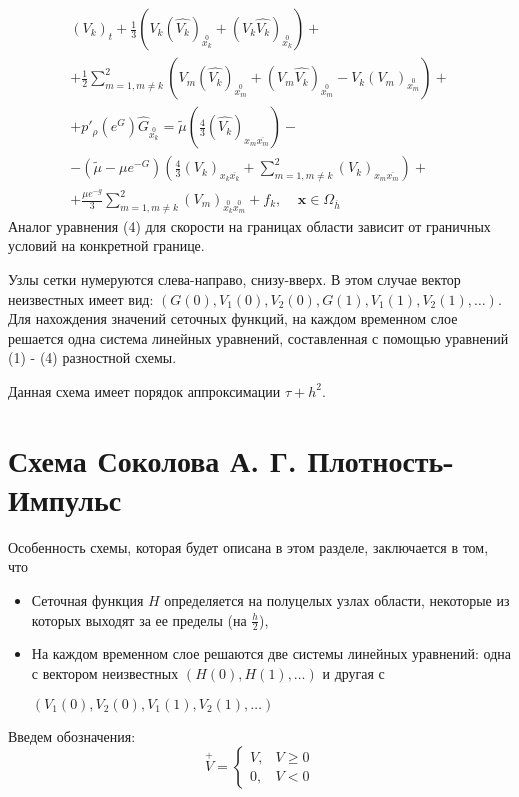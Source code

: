 \documentclass[specialist,subf,href,colorlinks=true,14pt,times,mtpro]{disser}
\newcommand{\wdrv}[1]{_{\stackrel{0}{#1}}}
\newcommand{\bdrv}[1]{_{\overline{#1}}}
\newcommand{\fdrv}[1]{_{#1}}
\newcommand{\ddrv}[1]{_{#1\overline{#1}}}
\newcommand{\doublewdrv}[2]{_{\stackrel{0}{#1}\stackrel{0}{#2}}}
\newcommand{\overp}[1]{{\stackrel{+}{#1}}}
\begin{document}
\begin{equation}
\begin{array}{l}
(V_k)\fdrv{t} + \frac{1}{3}\left(V_k (\hat{V_k})\wdrv{x_k} + (V_k\hat{V_k})\wdrv{x_k}\right) + \\
+ \frac{1}{2}\sum_{m = 1, m \ne k}^{2} \left(V_m(\hat{V_k})\wdrv{x_m} + (V_m \hat{V_k})\wdrv{x_m} - V_k (V_m)\wdrv{x_m}\right) + \\
+ p'_\rho (e^G)\hat{G}\wdrv{x_k} = \tilde{\mu}\left(\frac{4}{3} (\hat{V_k})\ddrv{x_m}\right) -  \\
-(\tilde{\mu} - \mu e^{-G}) \left(\frac{4}{3}(V_k)\ddrv{x_k} + \sum_{m = 1, m \ne k}^{2} (V_k)\ddrv{x_m}\right) + \\
+ \frac{\mu e^{-g}}{3} \sum_{m = 1, m \ne k}^{2} (V_m)\doublewdrv{x_k}{x_m} + f_k,\ \ \ \ \ \textbf{x} \in \Omega\bdrv{h}
\end{array}
\end{equation}
Аналог уравнения (4) для скорости на границах области зависит от граничных условий на конкретной границе.

Узлы сетки нумеруются слева-направо, снизу-вверх. В этом случае вектор неизвестных имеет вид: $(G (0), V_1 (0), V_2 (0), G (1), V_1 (1), V_2 (1), \ldots)$. Для нахождения значений сеточных функций, на каждом временном слое решается одна система линейных уравнений, составленная с помощью уравнений (1) - (4) разностной схемы.

Данная схема имеет порядок аппроксимации $\tau + h^2$.

\section{Схема Соколова А. Г. Плотность-Импульс}

Особенность схемы, которая будет описана в этом разделе, заключается в том, что
\begin{itemize}
    \item Сеточная функция $H$ определяется на полуцелых узлах области, некоторые из которых выходят за ее пределы (на $\frac{h}{2}$),
    \item На каждом временном слое решаются две системы линейных уравнений: одна с вектором неизвестных $(H (0), H (1), \ldots)$ и другая с 
    
    $(V_1 (0), V_2 (0), V_1 (1), V_2 (1), \ldots)$
\end{itemize}

Введем обозначения:
$$
\overp{V} = \begin{cases}
V, & V \geqslant 0 \\
0, & V < 0
\end{cases}
$$
\end{document}
